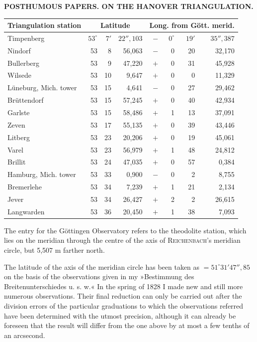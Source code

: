 \par\clearpage
\noindent{}\hfill{\small\textbf{POSTHUMOUS PAPERS. ON THE HANOVER TRIANGULATION.}}\hfill\null\par\medskip
\begin{center}
\begingroup\setlength{\tabcolsep}{4pt}\renewcommand{\arraystretch}{1.25}
\begin{tabular}{|l|rrr|rrrr|}
\hline
\multicolumn{1}{|c|}{Triangulation station}&\multicolumn{3}{c|}{Latitude}&\multicolumn{4}{c|}{Long. from Gött. merid.}\\\hline
Timpenberg&$53^\circ$&$7'$&$22''{,}103$&$-$&$0^\circ$&$19'$&$35''{,}387$\\
Nindorf&53&8&56,063&$-$&0&20&32,170\\
Bullerberg&53&9&47,220&$+$&0&31&45,928\\
Wilsede&53&10&9,647&$+$&0&0&11,329\\
Lüneburg, Mich. tower&53&15&4,641&$-$&0&27&29,462\\
Brüttendorf&53&15&57,245&$+$&0&40&42,934\\
Garlste&53&15&58,486&$+$&1&13&37,091\\
Zeven&53&17&55,135&$+$&0&39&43,446\\
Litberg&53&23&20,206&$+$&0&19&45,061\\
Varel&53&23&56,979&$+$&1&48&24,812\\
Brillit&53&24&47,035&$+$&0&57&0,384\\
Hamburg, Mich. tower&53&33&0,900&$-$&0&2&8,755\\
Bremerlehe&53&34&7,239&$+$&1&21&2,134\\
Jever&53&34&26,427&$+$&2&2&26,615\\
Langwarden&53&36&20,450&$+$&1&38&7,093\\
\end{tabular}\endgroup
\end{center}
\par\noindent\hspace*{\parindent}The entry for the Göttingen Observatory refers to the theodolite station, which lies on the meridian through the centre of the axis of \textsc{Reichenbach}'s meridian circle, but 5,507 m farther north.

\par\noindent\hspace*{\parindent}The latitude of the axis of the meridian circle has been taken as $=51^\circ31'47''{,}85$ on the basis of the observations given in my »Bestimmung des Breitenunterschiedes u. s. w.« In the spring of 1828 I made new and still more numerous observations. Their final reduction can only be carried out after the division errors of the particular graduations to which the observations referred have been determined with the utmost precision, although it can already be foreseen that the result will differ from the one above by at most a few tenths of an arcsecond.

